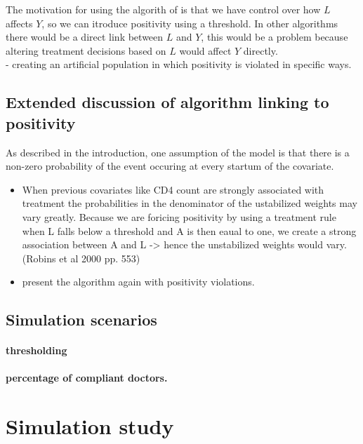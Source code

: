\documentclass[11pt]{article}
\providecommand{\tightlist}{%
      \setlength{\itemsep}{0pt}\setlength{\parskip}{0pt}}
\begin{document}
The motivation for using the algorith of \citet{Havercroft2012} is that
we have control over how \(L\) affects \(Y\), so we can itroduce
positivity using a threshold. In other algorithms there would be a
direct link between \(L\) and \(Y\), this would be a problem because
altering treatment decisions based on \(L\) would affect \(Y\)
directly.\\
- creating an artificial population in which positivity is violated in
specific ways.

\subsection{Extended discussion of algorithm linking to
positivity}\label{extended-discussion-of-algorithm-linking-to-positivity}

As described in the introduction, one assumption of the model is that
there is a non-zero probability of the event occuring at every startum
of the covariate.

\begin{itemize}
\tightlist
\item
  When previous covariates like CD4 count are strongly associated with
  treatment the probabilities in the denominator of the ustabilized
  weights may vary greatly. Because we are foricing positivity by using
  a treatment rule when L falls below a threshold and A is then eaual to
  one, we create a strong association between A and L -\textgreater{}
  hence the unstabilized weights would vary. (Robins et al 2000 pp. 553)
\item
  present the algorithm again with positivity violations.
\end{itemize}

\subsection{Simulation scenarios}\label{simulation-scenarios}

\paragraph{thresholding}\label{thresholding}

\paragraph{percentage of compliant
doctors.}\label{percentage-of-compliant-doctors.}

    \section{Simulation study}\label{simulation-study}
\end{document}
